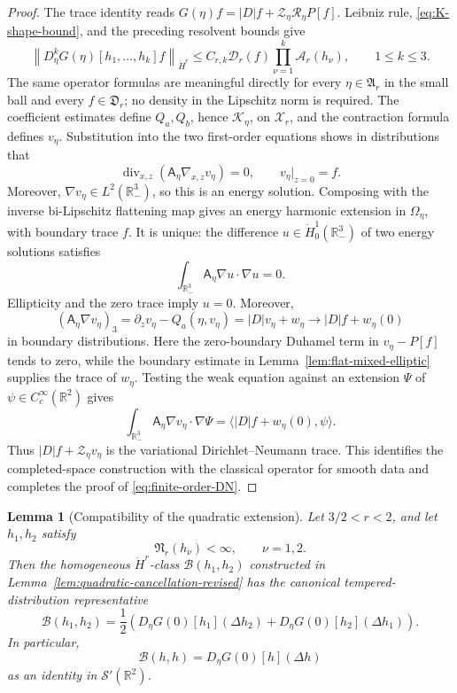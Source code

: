 \documentclass[12pt]{amsart}
\newtheorem{lemma}[theorem]{Lemma}
\theoremstyle{remark}
\theoremstyle{definition}
\numberwithin{equation}{section}
\newcommand{\R}{\mathbb{R}}
\begin{document}
\begin{proof}
The trace identity reads \(G(\eta)f=|D|f+\mathcal Z_\eta\mathcal R_\eta P[f]\).  Leibniz rule, \eqref{eq:K-shape-bound}, and the preceding resolvent bounds give
\[
 \left\| D_\eta^kG(\eta) [h_1,\ldots,h_k]f \right\|_{\dot H^r} \leq C_{r,k} \mathcal D_r(f) \prod_{\nu=1}^k \mathcal A_r(h_\nu), \qquad 1\leq k\leq3.
\]
The same operator formulas are meaningful directly for every
\(\eta\in\mathfrak A_r\) in the small ball and every
\(f\in\mathfrak D_r\); no density in the Lipschitz norm is required.
The coefficient estimates define \(Q_a,Q_b\), hence
\(\mathcal K_\eta\), on \(\mathcal X_r\), and the contraction formula
defines \(v_\eta\).  Substitution into the two first-order equations shows
in distributions that
\[
 \operatorname{div}_{x,z}(\mathsf A_\eta\nabla_{x,z}v_\eta)=0,
 \qquad v_\eta|_{z=0}=f.
\]
Moreover, \(\nabla v_\eta\in L^2(\R^3_-)\), so this is an energy
solution.  Composing with the inverse bi-Lipschitz flattening map gives an
energy harmonic extension in \(\Omega_\eta\), with boundary trace \(f\).
It is unique: the difference
\(u\in\dot H^1_0(\R^3_-)\) of two energy solutions satisfies
\[
 \int_{\R^3_-}\mathsf A_\eta\nabla u\cdot\nabla u=0.
\]
Ellipticity and the zero trace imply \(u=0\).  
Moreover,
\[
 (\mathsf A_\eta\nabla v_\eta)_3
 =\partial_zv_\eta-Q_a(\eta,v_\eta)=|D|v_\eta+w_\eta
 \longrightarrow |D|f+w_\eta(0)
\]
in boundary distributions.  Here the zero-boundary Duhamel term in
\(v_\eta-P[f]\) tends to zero, while the boundary estimate in
Lemma~\ref{lem:flat-mixed-elliptic} supplies the trace of \(w_\eta\).
Testing the weak equation against an extension \(\Psi\) of \(\psi\in C_c^\infty(\R^2)\) gives
\[
 \int_{\R^3_-}\mathsf A_\eta\nabla v_\eta\cdot\nabla\Psi =\langle |D|f+w_\eta(0),\psi\rangle.
\]
Thus \(|D|f+\mathcal Z_\eta v_\eta\) is the variational
Dirichlet--Neumann trace. This identifies the completed-space construction with the classical operator for smooth data and completes the proof of
\eqref{eq:finite-order-DN}.
\end{proof}

\begin{lemma}[Compatibility of the quadratic extension]
\label{lem:quadratic-compatibility}
Let \(3/2<r<2\), and let \(h_1,h_2\) satisfy
\[
 \mathfrak N_r(h_\nu)<\infty, \qquad \nu=1,2.
\]
Then the homogeneous \(\dot H^r\)-class \(\mathcal B(h_1,h_2)\) constructed in
Lemma~\ref{lem:quadratic-cancellation-revised} has the canonical tempered-distribution representative
\begin{equation}\label{eq:quadratic-compatibility}
 \mathcal B(h_1,h_2)
 = \frac12 \left( D_\eta G(0)[h_1](\Delta h_2)
  + D_\eta G(0)[h_2](\Delta h_1)
 \right).
\end{equation}
In particular,
\begin{equation}
\label{eq:quadratic-diagonal-compatibility}
 \mathcal B(h,h) = D_\eta G(0)[h](\Delta h)
\end{equation}
as an identity in \(\mathcal S'(\R^2)\).
\end{lemma}
\end{document}
